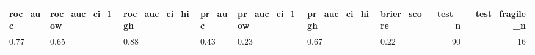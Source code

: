 \begin{tabular}{lllllllrr}
\toprule
roc\_auc & roc\_auc\_ci\_low & roc\_auc\_ci\_high & pr\_auc & pr\_auc\_ci\_low & pr\_auc\_ci\_high & brier\_score & test\_n & test\_fragile\_n \\
\midrule
0.77 & 0.65 & 0.88 & 0.43 & 0.23 & 0.67 & 0.22 & 90 & 16 \\
\bottomrule
\end{tabular}
